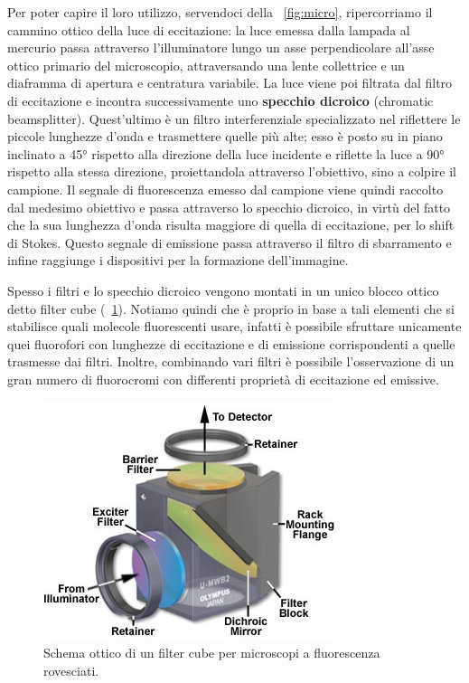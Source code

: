 Per poter capire il loro utilizzo, servendoci della \figurename~\ref{fig:micro}, ripercorriamo il cammino ottico della luce di eccitazione: la luce emessa dalla lampada al mercurio passa attraverso l'illuminatore lungo un asse perpendicolare all'asse ottico primario del microscopio, attraversando una lente collettrice e un diaframma di apertura e centratura variabile. 
La luce viene poi filtrata dal filtro di eccitazione e incontra successivamente uno \textbf{specchio dicroico} (chromatic beamsplitter). 
Quest'ultimo è un filtro interferenziale specializzato nel riflettere le piccole lunghezze d'onda e trasmettere quelle più alte; esso è posto su in piano inclinato a 45° rispetto alla direzione della luce incidente e riflette la luce a 90° rispetto alla stessa direzione, proiettandola attraverso l'obiettivo, sino a colpire il campione. 
Il segnale di fluorescenza emesso dal campione viene quindi raccolto dal medesimo obiettivo e passa attraverso lo specchio dicroico, in virtù del fatto che la sua lunghezza d'onda risulta maggiore di quella di eccitazione, per lo shift di Stokes. 
Questo segnale di emissione passa attraverso il filtro di sbarramento e infine raggiunge i dispositivi per la formazione dell'immagine.

Spesso i filtri e lo specchio dicroico vengono montati in un unico blocco ottico detto filter cube (\figurename~\ref{fig:cube}). 
Notiamo quindi che è proprio in base a tali elementi che si stabilisce quali molecole fluorescenti usare, infatti è possibile sfruttare unicamente quei fluorofori con lunghezze di eccitazione e di emissione corrispondenti a quelle trasmesse dai filtri. 
Inoltre, combinando vari filtri è possibile l'osservazione di un gran numero di fluorocromi con differenti proprietà di eccitazione ed emissive.

\begin{figure}
 \centering
 \includegraphics[scale=.50]{img/CAP2cube.jpg}
 \caption{\small{Schema ottico di un filter cube per microscopi a fluorescenza rovesciati.}}
 \label{fig:cube}
\end{figure}

